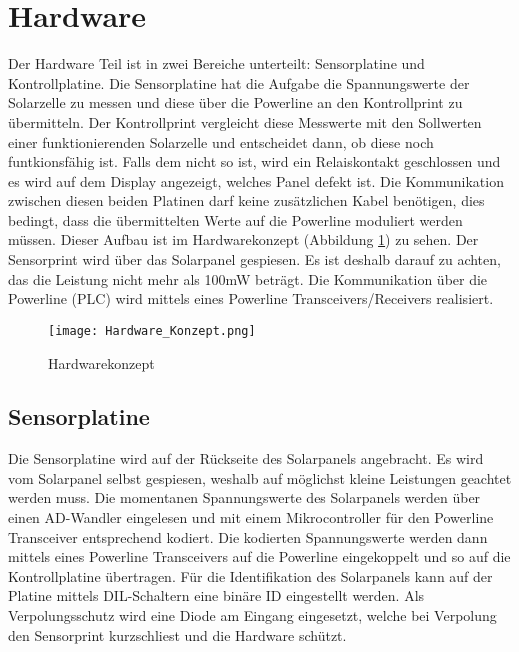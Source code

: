 %
%
%

\section{Hardware}

Der Hardware Teil ist in zwei Bereiche unterteilt: Sensorplatine und Kontrollplatine. Die Sensorplatine hat die Aufgabe die Spannungswerte der Solarzelle zu messen und diese über die Powerline an den Kontrollprint zu übermitteln.
Der Kontrollprint vergleicht diese Messwerte mit den Sollwerten einer funktionierenden Solarzelle und entscheidet dann, ob diese noch funtkionsfähig ist. Falls dem nicht so ist, wird ein Relaiskontakt geschlossen und es wird auf dem Display angezeigt, welches Panel defekt ist. 
Die Kommunikation zwischen diesen beiden Platinen darf keine zusätzlichen Kabel benötigen, dies bedingt, dass die übermittelten Werte auf die Powerline moduliert werden müssen. Dieser Aufbau ist im Hardwarekonzept (Abbildung \ref{fig::Hardwarekonzept}) zu sehen.
Der Sensorprint wird über das Solarpanel gespiesen. Es ist deshalb darauf zu achten, das die Leistung nicht mehr als 100mW beträgt.
Die Kommunikation über die Powerline (PLC) wird mittels eines Powerline Transceivers/Receivers realisiert.
\begin{figure}[h]
\centering
\texttt{[image: Hardware\_Konzept.png]}%
\caption{Hardwarekonzept}
\label{fig::Hardwarekonzept}%
\end{figure}

\subsection{Sensorplatine}


Die Sensorplatine wird auf der Rückseite des Solarpanels angebracht. Es wird vom Solarpanel selbst gespiesen, weshalb auf möglichst kleine Leistungen geachtet werden muss. Die momentanen Spannungswerte des Solarpanels werden über einen AD-Wandler eingelesen und mit einem Mikrocontroller für den Powerline Transceiver entsprechend kodiert. Die kodierten Spannungswerte werden dann mittels eines Powerline Transceivers auf die Powerline eingekoppelt und so auf die Kontrollplatine übertragen. Für die Identifikation des Solarpanels kann auf der Platine mittels DIL-Schaltern eine binäre ID eingestellt werden. Als Verpolungsschutz wird eine Diode am Eingang eingesetzt, welche bei Verpolung den Sensorprint kurzschliest und die Hardware schützt.

